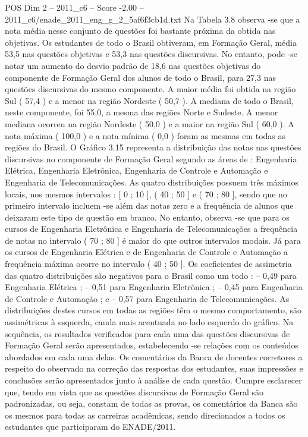 \begin{textsample}{POS Dim 2 – 2011\_c6 – Score -2.00 – 2011\_c6/enade\_2011\_eng\_g\_2\_5af6f3cb1d.txt}
Na Tabela 3.8 observa -se que a nota média nesse conjunto de questões foi bastante próxima da obtida nas objetivas.
Os estudantes de todo o Brasil obtiveram, em Formação Geral, média 53,5 nas questões objetivas e 53,3 nas questões discursivas.
No entanto, pode -se notar um aumento do desvio padrão de 18,6 nas questões objetivas do componente de Formação Geral dos alunos de todo o Brasil, para 27,3 nas questões discursivas do mesmo componente.
A maior média foi obtida na região Sul ( 57,4 ) e a menor na região Nordeste ( 50,7 ).
A mediana de todo o Brasil, neste componente, foi 55,0, a mesma das regiões Norte e Sudeste.
A menor mediana ocorreu na região Nordeste ( 50,0 ) e a maior na região Sul ( 60,0 ).
A nota máxima ( 100,0 ) e a nota mínima ( 0,0 ) foram as mesmas em todas as regiões do Brasil.
O Gráfico 3.15 representa a distribuição das notas nas questões discursivas no componente de Formação Geral segundo as áreas de : Engenharia Elétrica, Engenharia Eletrônica, Engenharia de Controle e Automação e Engenharia de Telecomunicações.
As quatro distribuições possuem três máximos locais, nos mesmos intervalos : [ 0 ; 10 ], ( 40 ; 50 ] e ( 70 ; 80 ], sendo que no primeiro intervalo incluem -se além das notas zero e a frequência de alunos que deixaram este tipo de questão em branco.
No entanto, observa -se que para os cursos de Engenharia Eletrônica e Engenharia de Telecomunicações a frequência de notas no intervalo ( 70 ; 80 ] é maior do que outros intervalos modais.
Já para os cursos de Engenharia Elétrica e de Engenharia de Controle e Automação a frequência máxima ocorre no intervalo ( 40 ; 50 ].
Os coeficientes de assimetria das quatro distribuições são negativos para o Brasil como um todo : – 0,49 para Engenharia Elétrica ; – 0,51 para Engenharia Eletrônica ; – 0,45 para Engenharia de Controle e Automação ; e – 0,57 para Engenharia de Telecomunicações.
As distribuições destes cursos em todas as regiões têm o mesmo comportamento, são assimétricas à esquerda, cauda mais acentuada no lado esquerdo do gráfico.
Na sequência, os resultados verificados para cada uma das questões discursivas de Formação Geral serão apresentados, estabelecendo -se relações com os conteúdos abordados em cada uma delas.
Os comentários da Banca de docentes corretores a respeito do observado na correção das respostas dos estudantes, suas impressões e conclusões serão apresentados junto à análise de cada questão.
Cumpre esclarecer que, tendo em vista que as questões discursivas de Formação Geral são padronizadas, ou seja, constam de todas as provas, os comentários da Banca são os mesmos para todas as carreiras acadêmicas, sendo direcionados a todos os estudantes que participaram do ENADE/2011.

\end{textsample}
